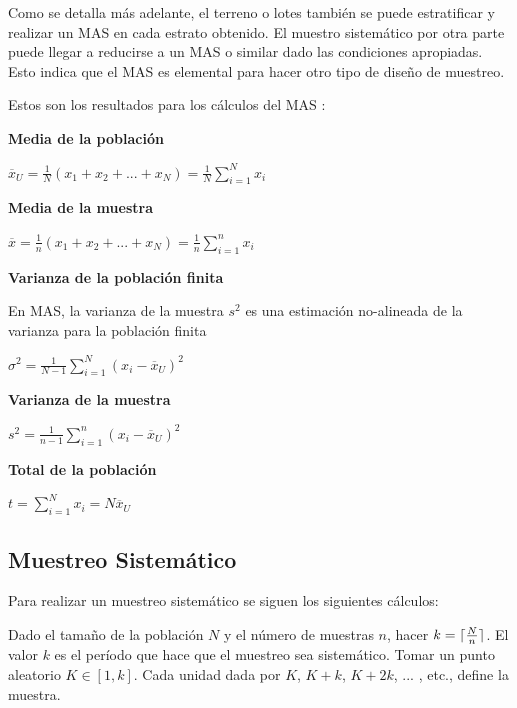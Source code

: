 \documentclass[conference]{IEEEtran}
\DeclarePairedDelimiter{\ceil}{\lceil}{\rceil}
\begin{document}
Como se detalla más adelante, el terreno o lotes también se puede estratificar y realizar un MAS en cada estrato obtenido. El muestro sistemático por otra parte puede llegar a reducirse a un MAS o similar dado las condiciones apropiadas. Esto indica que el MAS es elemental para hacer otro tipo de diseño de muestreo.

\bigbreak

Estos son los resultados para los cálculos del MAS \cite{thompson-2012}:

\bigbreak
\textbf{Media de la población}

\bigbreak

$\overline{x}_U = \frac{1}{N}(x_1 + x_2 + ... + x_N) = \frac{1}{N} \sum \limits_{i=1}^N x_i$


\bigbreak
\textbf{Media de la muestra}

\bigbreak

$\overline{x} = \frac{1}{n}(x_1 + x_2 + ... + x_N) = \frac{1}{n} \sum \limits_{i=1}^n x_i$

\bigbreak

\textbf{Varianza de la población finita}

\bigbreak

En MAS, la varianza de la muestra $s^2$ es una estimación no-alineada de la varianza para la población finita

\bigbreak

$\sigma^2 = \frac{1}{N-1} \sum \limits_{i=1}^{N} (x_i - \overline{x}_U)^2$


\bigbreak
\textbf{Varianza de la muestra}

\bigbreak

$s^2 = \frac{1}{n-1} \sum \limits_{i=1}^n (x_i - \overline{x}_U)^2$


\bigbreak
\textbf{Total de la población}

\bigbreak

$t = \sum \limits_{i=1}^N x_i = N \overline{x}_U$


\subsection{Muestreo Sistemático}

Para realizar un muestreo sistemático se siguen los siguientes cálculos:

\bigbreak

Dado el tamaño de la población $N$ y el número de muestras $n$, hacer $k=\ceil{\frac{N}{n}}$. El valor $k$ es el período que hace que el muestreo sea sistemático. Tomar un punto aleatorio $K \in [1, k]$. Cada unidad dada por $K$, $K + k$, $K + 2k$, ... , etc., define la muestra.
\end{document}
